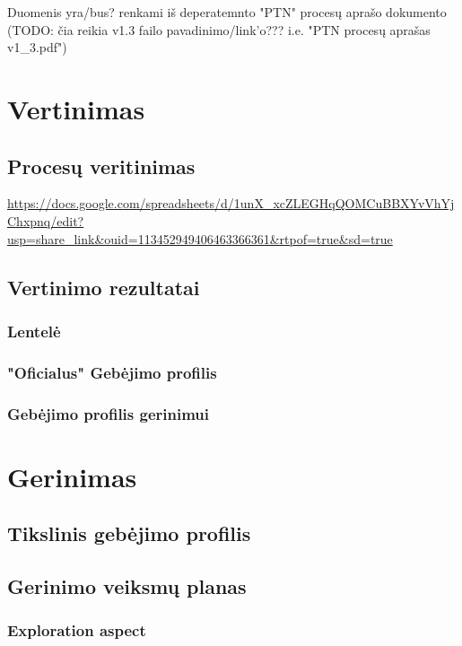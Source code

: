 \documentclass{article}
\begin{document}
Duomenis yra/bus? renkami iš deperatemnto "PTN" procesų aprašo dokumento (TODO: čia reikia v1.3 failo pavadinimo/link'o??? i.e. "PTN procesų aprašas v1\_3.pdf")

\section{Vertinimas}

\subsection{Procesų veritinimas}

\url{https://docs.google.com/spreadsheets/d/1unX_xcZLEGHqQOMCuBBXYvVhYjChxpnq/edit?usp=share_link&ouid=113452949406463366361&rtpof=true&sd=true }

\subsection{Vertinimo rezultatai}

\subsubsection{Lentelė}
\subsubsection{"Oficialus" Gebėjimo profilis}
\subsubsection{Gebėjimo profilis gerinimui}


\section{Gerinimas}

\subsection{Tikslinis gebėjimo profilis}

\subsection{Gerinimo veiksmų planas}

\subsubsection{Exploration aspect}
\end{document}
